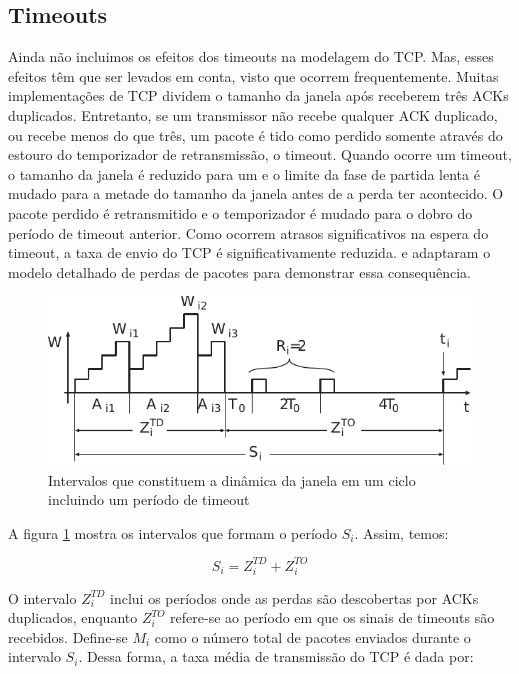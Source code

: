 \subsection{Timeouts}

Ainda não incluimos os efeitos dos timeouts na modelagem do TCP. Mas, esses efeitos têm que ser levados em conta, visto que ocorrem frequentemente. Muitas implementações de TCP dividem o tamanho da janela após receberem três ACKs duplicados. Entretanto, se um transmissor não recebe qualquer ACK duplicado, ou recebe menos do que três, um pacote é tido como perdido somente através do estouro do temporizador de retransmissão, o timeout. Quando ocorre um timeout, o tamanho da janela é reduzido para um e o limite da fase de partida lenta é mudado para a metade do tamanho da janela antes de a perda ter acontecido. O pacote perdido é retransmitido e o temporizador é mudado para o dobro do período de timeout anterior. Como ocorrem atrasos significativos na espera do timeout, a taxa de envio do TCP é significativamente reduzida. \cite{hassan2004high} e \cite{padhye1998modeling} adaptaram o modelo detalhado de perdas de pacotes para demonstrar essa consequência.

\begin{figure}
\begin{center}
\includegraphics[scale=0.7]{figs/timeout.pdf} 
\caption{Intervalos que constituem a dinâmica da janela em um ciclo incluindo um período de timeout}
\label{fig5.3}
\end{center}
\end{figure}

A figura \ref{fig5.3} mostra os intervalos que formam o período $S_i$. Assim, temos:

$$S_i = Z_i^{TD} + Z_i^{TO}$$

O intervalo $Z_i^{TD}$ inclui os períodos onde as perdas são descobertas por ACKs duplicados, enquanto $Z_i^{TO}$ refere-se ao período em que os sinais de timeouts são recebidos. Define-se $M_i$ como o número total de pacotes enviados durante o intervalo $S_i$. Dessa forma, a taxa média de transmissão do TCP é dada por:

